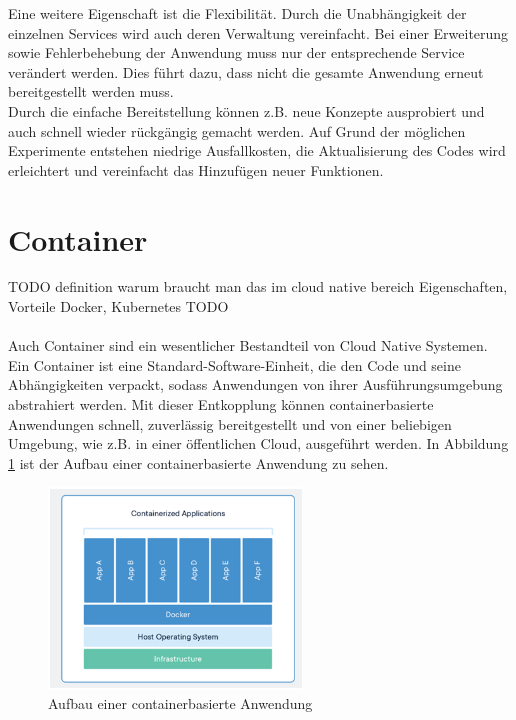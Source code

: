 Eine weitere Eigenschaft ist die Flexibilität. Durch die Unabhängigkeit der einzelnen Services wird auch deren Verwaltung vereinfacht. Bei einer Erweiterung sowie Fehlerbehebung der Anwendung muss nur der entsprechende Service verändert werden. Dies führt dazu, dass nicht die gesamte Anwendung erneut bereitgestellt werden muss.\\
Durch die einfache Bereitstellung können z.B. neue Konzepte ausprobiert und auch schnell wieder rückgängig gemacht werden. Auf Grund der möglichen Experimente entstehen niedrige Ausfallkosten, die Aktualisierung des Codes wird erleichtert und vereinfacht das Hinzufügen neuer Funktionen.
\\

\section{Container}
TODO definition
warum braucht man das im cloud native bereich
Eigenschaften, Vorteile
Docker, Kubernetes TODO\\
\\
Auch Container sind ein wesentlicher Bestandteil von Cloud Native Systemen. \\
Ein Container ist eine Standard-Software-Einheit, die den Code und seine Abhängigkeiten verpackt, sodass Anwendungen von ihrer Ausführungsumgebung abstrahiert werden. Mit dieser Entkopplung können containerbasierte Anwendungen schnell, zuverlässig bereitgestellt und von einer beliebigen Umgebung, wie z.B. in einer öffentlichen Cloud, ausgeführt werden. In Abbildung \ref{container} ist der Aufbau einer containerbasierte Anwendung zu sehen.\\
\begin{figure}[bth] 
	\centering
	\includegraphics[width=0.6\textwidth]{Graphics/Container.png}
	\caption{Aufbau einer containerbasierte Anwendung}
	\label{container}
\end{figure}\\
